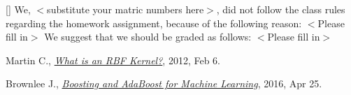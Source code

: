 \documentclass{article}
\begin{document}
[] We, $<$substitute your matric numbers here$>$, did not follow the class rules regarding the homework assignment, because of the following reason: $<$Please fill in$>$
We suggest that we should be graded as follows: $<$Please fill in$>$
\newpage

\begin{thebibliography}{20}
	Martin C.,
	\emph{\href{https://charlesmartin14.wordpress.com/2012/02/06/kernels_part_1/}{What is an RBF Kernel?}},
	2012, Feb 6.
	
	Brownlee J.,
	\emph{\href{http://machinelearningmastery.com/boosting-and-adaboost-for-machine-learning/}{Boosting and AdaBoost for Machine Learning}},
	2016, Apr 25.
\end{thebibliography}
\end{document}
